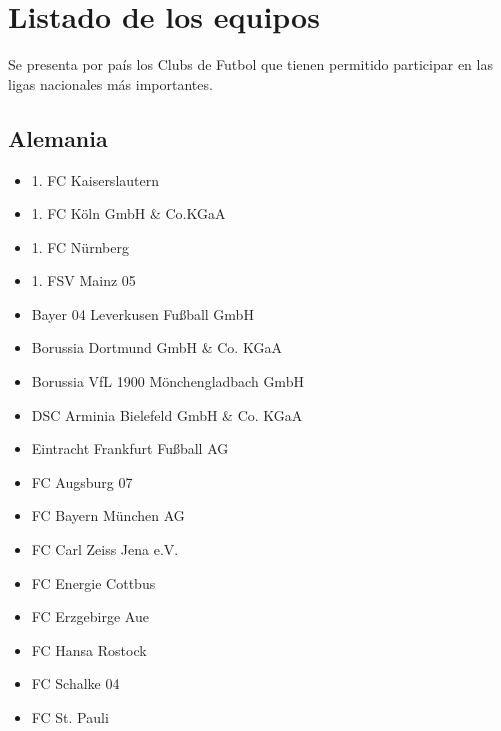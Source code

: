 \chapter{Listado de los equipos}\label{chap:equipos}
Se presenta por país los Clubs de Futbol que tienen permitido participar en las ligas nacionales más importantes.
\section{Alemania}
\begin{multicols}{2}
	\begin{itemize}
	    \setlength{\itemsep}{1pt}
	    \setlength{\parskip}{0pt}
	    \setlength{\parsep}{0pt}

		\item 1. FC Kaiserslautern

		\item 1. FC Köln GmbH \& Co.KGaA

		\item 1. FC Nürnberg

		\item 1. FSV Mainz 05

		\item Bayer 04 Leverkusen Fußball GmbH

		\item Borussia Dortmund GmbH \& Co. KGaA

		\item Borussia VfL 1900 Mönchengladbach GmbH

		\item DSC Arminia Bielefeld GmbH \& Co. KGaA

		\item Eintracht Frankfurt Fußball AG

		\item FC Augsburg 07

		\item FC Bayern München AG

		\item FC Carl Zeiss Jena e.V.

		\item FC Energie Cottbus

		\item FC Erzgebirge Aue

		\item FC Hansa Rostock

		\item FC Schalke 04

		\item FC St. Pauli


\end{itemize}
\end{multicols}
